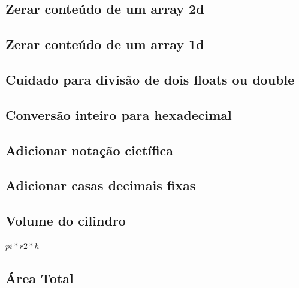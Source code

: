 \documentclass[a4paper,12pt]{article}
\begin{document}
\subsection{Zerar conteúdo de um array 2d}


\subsection{Zerar conteúdo de um array 1d}


\subsection{Cuidado para divisão de dois floats ou double}


\subsection{Conversão inteiro para hexadecimal}


\subsection{Adicionar notação cietífica}


\subsection{Adicionar casas decimais fixas}


\subsection{Volume do cilindro}

\(pi * r2 * h\)

\subsection{Área Total}
\end{document}
